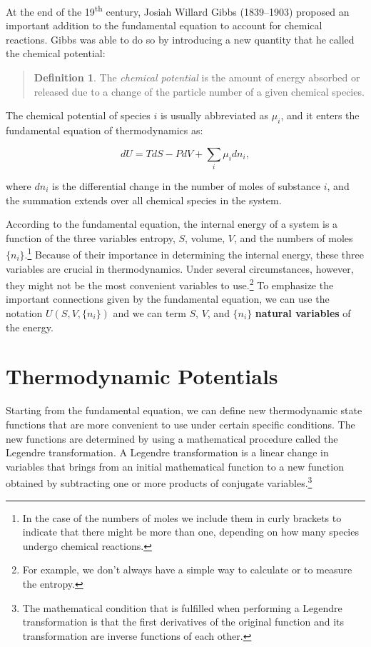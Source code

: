 \documentclass[
  9pt,
]{extbook}
\theoremstyle{definition}
\newtheorem{definition}{Definition}[chapter]
\theoremstyle{definition}
\theoremstyle{definition}
\theoremstyle{remark}
\begin{document}
At the end of the 19\textsuperscript{th} century, Josiah Willard Gibbs (1839--1903) proposed an important addition to the fundamental equation to account for chemical reactions. Gibbs was able to do so by introducing a new quantity that he called the chemical potential:

\begin{quote}
\begin{definition}
\protect\hypertarget{def:chemicalpot}{}{\label{def:chemicalpot} }The \emph{chemical potential} is the amount of energy absorbed or released due to a change of the particle number of a given chemical species.
\end{definition}
\end{quote}

The chemical potential of species \(i\) is usually abbreviated as \(\mu_i\), and it enters the fundamental equation of thermodynamics as:

\begin{equation}
dU = TdS-PdV+\sum_i\mu_i dn_i,
\label{eq:dunv2}
\end{equation}

where \(dn_i\) is the differential change in the number of moles of substance \(i\), and the summation extends over all chemical species in the system.

According to the fundamental equation, the internal energy of a system is a function of the three variables entropy, \(S\), volume, \(V\), and the numbers of moles \(\{n_i\}\).\footnote{In the case of the numbers of moles we include them in curly brackets to indicate that there might be more than one, depending on how many species undergo chemical reactions.} Because of their importance in determining the internal energy, these three variables are crucial in thermodynamics. Under several circumstances, however, they might not be the most convenient variables to use.\footnote{For example, we don't always have a simple way to calculate or to measure the entropy.} To emphasize the important connections given by the fundamental equation, we can use the notation \(U(S,V,\{n_i\})\) and we can term \(S\), \(V\), and \(\{n_i\}\) \textbf{natural variables} of the energy.

\hypertarget{thermpot}{%
\section{Thermodynamic Potentials}\label{thermpot}}

Starting from the fundamental equation, we can define new thermodynamic state functions that are more convenient to use under certain specific conditions. The new functions are determined by using a mathematical procedure called the Legendre transformation. A Legendre transformation is a linear change in variables that brings from an initial mathematical function to a new function obtained by subtracting one or more products of conjugate variables.\footnote{The mathematical condition that is fulfilled when performing a Legendre transformation is that the first derivatives of the original function and its transformation are inverse functions of each other.}
\end{document}
